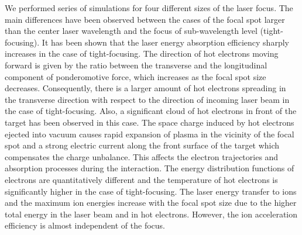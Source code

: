 We performed series of simulations for four different sizes of the laser focus. The main differences have been observed between the cases of the focal spot larger than the center laser wavelength and the focus of sub-wavelength level (tight-focusing). It has been shown that the laser energy absorption efficiency sharply increases in the case of tight-focusing. The direction of hot electrons moving forward is given by the ratio between the transverse and the longitudinal component of ponderomotive force, which increases as the focal spot size decreases. Consequently, there is a larger amount of hot electrons spreading in the transverse direction with respect to the direction of incoming laser beam in the case of tight-focusing. Also, a significant cloud of hot electrons in front of the target has been observed in this case. The space charge induced by hot electrons ejected into vacuum causes rapid expansion of plasma in the vicinity of the focal spot and a strong electric current along the front surface of the target which compensates the charge unbalance. This affects the electron trajectories and absorption processes during the interaction. The energy distribution functions of electrons are quantitatively different and the temperature of hot electrons is significantly higher in the case of tight-focusing. The laser energy transfer to ions and the maximum ion energies increase with the focal spot size due to the higher total energy in the laser beam and in hot electrons. However, the ion acceleration efficiency is almost independent of the focus.

